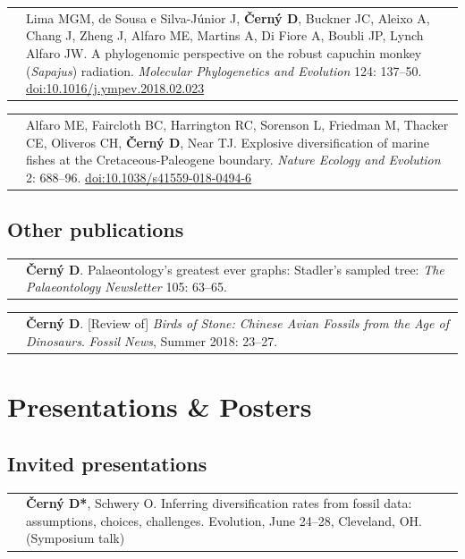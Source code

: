 \documentclass[10pt]{article}
\begin{document}
\begin{tabularx}{\textwidth}{>{\raggedleft\arraybackslash}p{2.2cm} X}
2018 & Lima MGM, de Sousa e Silva-J\'{u}nior J, \textbf{\v{C}ern\'{y} D}, Buckner JC, Aleixo A, Chang J, Zheng J, Alfaro ME, Martins A, Di Fiore A, Boubli JP, Lynch Alfaro JW. A phylogenomic perspective on the robust capuchin monkey (\textit{Sapajus}) radiation. \textit{Molecular Phylogenetics and Evolution} 124: 137--50. \href{http://doi.org/10.1016/j.ympev.2018.02.023}{doi:10.1016/j.ympev.2018.02.023}
\end{tabularx}
\begin{tabularx}{\textwidth}{>{\raggedleft\arraybackslash}p{2.2cm} X}
2018 & Alfaro ME, Faircloth BC, Harrington RC, Sorenson L, Friedman M, Thacker CE, Oliveros CH, \textbf{\v{C}ern\'{y} D}, Near TJ. Explosive diversification of marine fishes at the Cretaceous-Paleogene boundary. \textit{Nature Ecology and Evolution} 2: 688--96. \href{http://doi.org/10.1038/s41559-018-0494-6}{doi:10.1038/s41559-018-0494-6}
\end{tabularx}

\subsection*{Other publications}

\begin{tabularx}{\textwidth}{>{\raggedleft\arraybackslash}p{2.2cm} X}
2020 & \textbf{\v{C}ern\'{y} D}. Palaeontology's greatest ever graphs:
Stadler's sampled tree: \textit{The Palaeontology Newsletter} 105: 63--65.
\end{tabularx}
\begin{tabularx}{\textwidth}{>{\raggedleft\arraybackslash}p{2.2cm} X}
2018 & \textbf{\v{C}ern\'{y} D}. [Review of] \textit{Birds of Stone: Chinese Avian Fossils from the Age of Dinosaurs}. \textit{Fossil News}, Summer 2018: 23--27.
\end{tabularx}

\section*{Presentations \& Posters}

\subsection*{Invited presentations}

\begin{tabularx}{\textwidth}{>{\raggedleft\arraybackslash}p{2.2cm} X}
2022 & \textbf{\v{C}ern\'{y} D*}, Schwery O. Inferring diversification rates from fossil data: assumptions, choices, challenges. Evolution, June 24--28, Cleveland, OH. (Symposium talk)
\end{tabularx}
\end{document}
